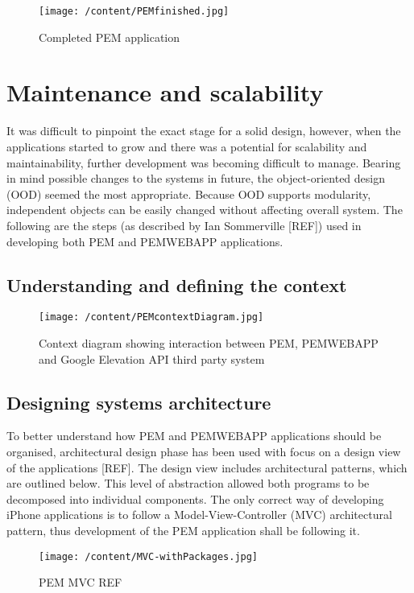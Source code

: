 \documentclass[12pt, a4paper]{report}   %
\begin{document}
\begin{enumerate}
\begin{figure}[H]
  \centering
	\texttt{[image: /content/PEMfinished.jpg]}
	  \caption{Completed PEM application}
\end{figure}


\clearpage
\section{Maintenance and scalability}
It was difficult to pinpoint the exact stage for a solid design, however, when the applications started to grow and there was a potential for scalability and maintainability, further development was becoming difficult to manage. Bearing in mind possible changes to the systems in future, the object-oriented design (OOD) seemed the most appropriate. Because OOD supports modularity, independent objects can be easily changed without affecting overall system. The following are the steps (as described by Ian Sommerville [REF]) used in developing both PEM and PEMWEBAPP applications.


\subsection{Understanding and defining the context}
	
	
\begin{figure}[H]
  \centering
	\texttt{[image: /content/PEMcontextDiagram.jpg]}
	  \caption{Context diagram showing interaction between PEM, PEMWEBAPP and Google Elevation API third party system}
\end{figure}


\subsection{Designing systems architecture}
To better understand how PEM and PEMWEBAPP applications should be organised, architectural design phase has been used with focus on a design view of the applications [REF]. The design view includes architectural patterns, which are outlined below. This level of abstraction allowed both programs to be decomposed into individual components. The only correct way of developing iPhone applications is to follow a Model-View-Controller (MVC) architectural pattern, thus development of the PEM application shall be following it.\\
	

\begin{figure}[H]
  \centering
	\texttt{[image: /content/MVC-withPackages.jpg]}
	  \caption{PEM MVC REF}
\end{figure}



\end{enumerate}
\end{document}

